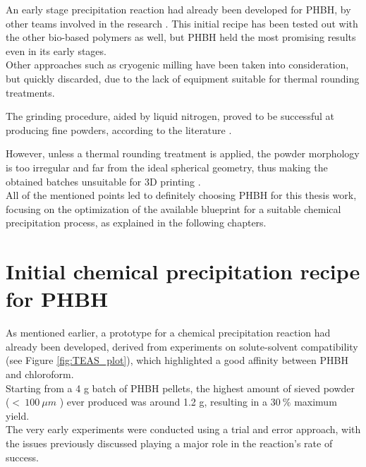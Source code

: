 \documentclass{article}
\begin{document}
    An early stage precipitation reaction had already been developed for PHBH, by other teams involved in the research \autocites{Messori_Bondioli_PHAs}. 
    This initial recipe has been tested out with the other bio-based polymers as well, but PHBH held the most promising 
    results even in its early stages. \\ 

    Other approaches such as cryogenic milling have been taken into consideration, but quickly 
    discarded, due to the lack of equipment suitable for thermal rounding treatments. 

    The grinding procedure, aided by liquid nitrogen, proved to be successful at producing fine powders, according to the literature \autocites{Dechet_Schmidt_thermal_rounding}. 

    However, unless a thermal rounding treatment is applied, the powder 
    morphology is too irregular and far from the ideal spherical geometry, thus making the 
    obtained batches unsuitable for 3D printing \autocites{Dechet_Schmidt_thermal_rounding}. \\  

    All of the mentioned points led to definitely choosing PHBH for this thesis work, focusing on the optimization of 
    the available blueprint for a suitable chemical 
    precipitation process, as explained in the following chapters. 

    \clearpage
    \section{Initial chemical precipitation recipe for PHBH\label{Initial_recipe}}
    
    As mentioned earlier, a prototype for a chemical precipitation reaction had already been developed, 
    derived from experiments on solute-solvent compatibility (see Figure \ref{fig:TEAS_plot}), 
    which highlighted a good affinity between PHBH and chloroform. \\ 

    Starting from a 4 g batch of PHBH pellets, the highest amount of sieved powder ($ < \ 100 \ \mu m$ )
    ever produced was around 1.2 g, resulting in a $30 \ \% $ maximum yield. \\ 

    The very early experiments were conducted using a trial and error approach, with the issues previously discussed 
    playing a major role in the reaction's rate of success. 
    
\end{document}
